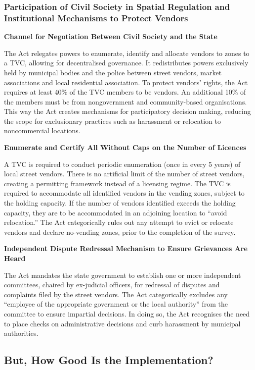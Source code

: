 \documentclass[a4paper, 12pt, twoside]{article}
\begin{document}
\subsubsection*{Participation of Civil Society in Spatial Regulation and Institutional Mechanisms to Protect Vendors}



\textbf{Channel for Negotiation Between Civil Society and the State}

The Act relegates powers to enumerate, identify and allocate vendors to zones to a TVC, allowing for decentralised governance. It redistributes powers exclusively held by municipal bodies and the police between street vendors, market associations and local residential association. To protect vendors’ rights, the Act requires at least 40\% of the TVC members to be vendors. An additional 10\% of the members must be from nongovernment and community-based organisations. This way the Act creates mechanisms for participatory decision making, reducing the scope for exclusionary practices such as harassment or relocation to noncommercial locations.

\textbf{Enumerate and Certify All Without Caps on the Number of Licences}

A TVC is required to conduct periodic enumeration (once in every 5 years) of local street vendors. There is no artificial limit of the number of street vendors, creating a permitting framework instead of a licensing regime. The TVC is required to accommodate all identified vendors in the vending zones, subject to the holding capacity.  If the number of vendors identified exceeds the holding capacity, they are to be accommodated in an adjoining location to “avoid relocation.” The Act categorically rules out any attempt to evict or relocate vendors and declare no-vending zones, prior to the completion of the survey.

\newpage
\textbf{Independent Dispute Redressal Mechanism to Ensure Grievances Are Heard }

The Act mandates the state government to establish one or more independent committees, chaired by ex-judicial officers, for redressal of disputes and complaints filed by the street vendors. The Act categorically excludes any “employee of the appropriate government or the local authority” from the committee to ensure impartial decisions. In doing so, the Act recognises the need to place checks on administrative decisions and curb harassment by municipal authorities.

\subsection*{But, How Good Is the Implementation?}
\end{document}
